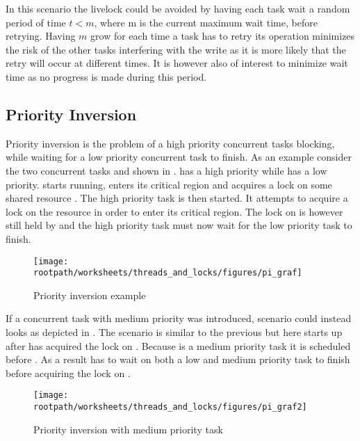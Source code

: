 In this scenario the livelock could be avoided by having each task wait a random period of time $t < m$, where m is the current maximum wait time, before retrying. Having $m$ grow for each time a task has to retry its operation minimizes the risk of the other tasks interfering with the write as it is more likely that the retry will occur at different times. It is however also of interest to minimize wait time as no progress is made during this period.

\subsection{Priority Inversion}
Priority inversion is the problem of a high priority concurrent tasks blocking, while waiting for a low priority concurrent task to finish\cite[p. 456]{tanenbaum2008modern}. As an example consider the two concurrent tasks  and  shown in .  has a high priority while  has a low priority.  starts running, enters its critical region and acquires a lock on some shared resource . The high priority task  is then started. It attempts to acquire a lock on the resource  in order to enter its critical region. The lock on  is however still held by  and the high priority task  must now wait for the low priority task  to finish.

\begin{figure}[htbp]
\centering
 \texttt{[image: \\rootpath/worksheets/threads\_and\_locks/figures/pi\_graf]} 
 \caption{Priority inversion example}
\label{fig:priority_inversion}
\end{figure}
If a concurrent task  with medium priority was introduced, scenario could instead looks as depicted in . The scenario is similar to the previous but here  starts up after  has acquired the lock on . Because  is a medium priority task it is scheduled before . As a result  has to wait on both a low and medium priority task to finish before acquiring the lock on .

\begin{figure}[htbp]
\centering
 \texttt{[image: \\rootpath/worksheets/threads\_and\_locks/figures/pi\_graf2]} 
 \caption{Priority inversion with medium priority task}
\label{fig:priority_inversion_m}
\end{figure}

